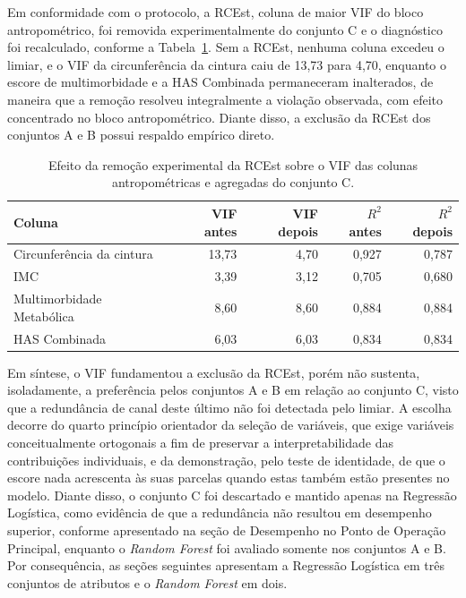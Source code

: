 Em conformidade com o protocolo, a RCEst, coluna de maior VIF do bloco antropométrico, foi removida experimentalmente do conjunto C e o diagnóstico foi recalculado, conforme a Tabela~\ref{tab:vif-ablacao}. Sem a RCEst, nenhuma coluna excedeu o limiar, e o VIF da circunferência da cintura caiu de 13,73 para 4,70, enquanto o escore de multimorbidade e a HAS Combinada permaneceram inalterados, de maneira que a remoção resolveu integralmente a violação observada, com efeito concentrado no bloco antropométrico. Diante disso, a exclusão da RCEst dos conjuntos A e B possui respaldo empírico direto.

\begin{table}[htb]
  \centering
  \caption{\label{tab:vif-ablacao}Efeito da remoção experimental da RCEst sobre o VIF das colunas antropométricas e agregadas do conjunto C.}
  \begin{tabular}{lrrrr}
    \hline
    Coluna & VIF antes & VIF depois & $R^2$ antes & $R^2$ depois \\ \hline
    Circunferência da cintura & 13,73 & 4,70 & 0,927 & 0,787 \\
    IMC & 3,39 & 3,12 & 0,705 & 0,680 \\
    Multimorbidade Metabólica & 8,60 & 8,60 & 0,884 & 0,884 \\
    HAS Combinada & 6,03 & 6,03 & 0,834 & 0,834 \\ \hline
  \end{tabular}
\end{table}

Em síntese, o VIF fundamentou a exclusão da RCEst, porém não sustenta, isoladamente, a preferência pelos conjuntos A e B em relação ao conjunto C, visto que a redundância de canal deste último não foi detectada pelo limiar. A escolha decorre do quarto princípio orientador da seleção de variáveis, que exige variáveis conceitualmente ortogonais a fim de preservar a interpretabilidade das contribuições individuais, e da demonstração, pelo teste de identidade, de que o escore nada acrescenta às suas parcelas quando estas também estão presentes no modelo. Diante disso, o conjunto C foi descartado e mantido apenas na Regressão Logística, como evidência de que a redundância não resultou em desempenho superior, conforme apresentado na seção de Desempenho no Ponto de Operação Principal, enquanto o \textit{Random Forest} foi avaliado somente nos conjuntos A e B. Por consequência, as seções seguintes apresentam a Regressão Logística em três conjuntos de atributos e o \textit{Random Forest} em dois.

